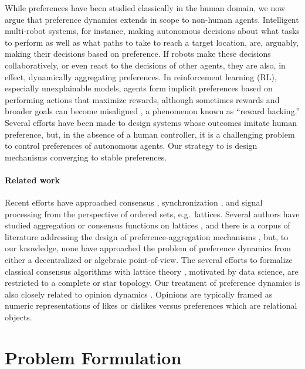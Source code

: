 \documentclass[conference]{ieeeconf}
\begin{document}
While preferences have been studied classically in the human domain, we now argue that preference dynamics extends in scope to non-human agents.
Intelligent multi-robot systems, for instance, making autonomous decisions about what tasks to perform as well as what paths to take to reach a target location, are, arguably, making their decisions based on preference. If robots make these decisions collaboratively, or even react to the decisions of other agents, they are also, in effect, dynamically aggregating preferences. In reinforcement learning (RL), especially unexplainable models, agents form implicit preferences based on performing actions that maximize rewards, although sometimes rewards and broader goals can become misaligned \cite{pan2022}, a phenomenon known as ``reward hacking.'' Several efforts \cite{?} have been made to design systems whose outcomes imitate human preference, but, in the absence of a human controller, it is a challenging problem to control preferences of autonomous agents. Our strategy to is design  mechanisms converging to stable preferences.

\paragraph*{Related work}

Recent efforts have approached consensus \cite{riess2022}, synchronization \cite{maxplussync}, and signal processing \cite{puschel} from the perspective of ordered sets, e.g.~lattices. Several authors have studied aggregation or consensus functions on lattices \cite{frenchdudes}, and there is a corpus of literature addressing the design of preference-aggregation mechanisms \cite{arrow2012}, but, to our knowledge, none have approached the problem of preference dynamics from either a decentralized or algebraic point-of-view. The several efforts to formalize classical consensus algorithms with lattice theory \cite{consensus}, motivated by data science, are restricted to a complete or star topology. Our treatment of preference dynamics is also closely related to opinion dynamics \cite{opinion}. Opinions are typically framed as numeric representations of likes or dislikes versus preferences which are relational objects.


\section{Problem Formulation}
\end{document}
